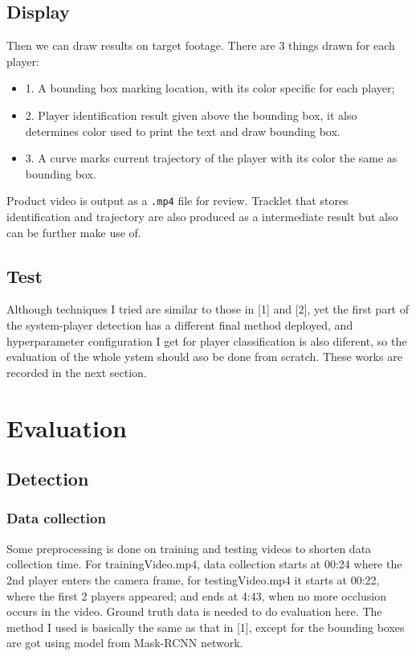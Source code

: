 \documentclass{article}
\begin{document}
\subsection{Display}
Then we can draw results on target footage. There are 3 things drawn for each player:
\begin{itemize}
\item 1. A bounding box marking location, with its color specific for each player;
\item 2. Player identification result given above the bounding box, it also determines color used to print the text and draw bounding box.
\item 3. A curve marks current trajectory of the player with its color the same as bounding box.
\end{itemize}
Product video is output as a \texttt{.mp4} file for review. Tracklet that stores identification and trajectory are also produced as a intermediate result but also can be further make use of.
\subsection{Test}
Although techniques I tried are similar to those in [1] and [2], yet the first part of the system-player detection has a different final method deployed, and hyperparameter configuration I get for player classification is also diferent, so the evaluation of the whole ystem should aso be done from scratch. These works are recorded in the next section.
\newpage

\section{Evaluation}
\subsection{Detection}
\subsubsection{Data collection}
Some preprocessing is done on training and testing videos to shorten data collection time. For trainingVideo.mp4, data collection starts at 00:24 where the 2nd player enters the camera frame, for testingVideo.mp4 it starts at 00:22, where the first 2 players appeared; and ends at 4:43, when no more occlusion occurs in the video.
Ground truth data is needed to do evaluation here. The method I used is basically the same as that in [1], except for the bounding boxes are got using model from Mask-RCNN network.
\end{document}
